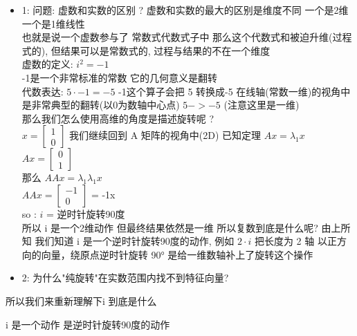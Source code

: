 \documentclass[12pt]{article}
\begin{document}
\begin{flushleft}
\begin{itemize}
        \item 1: 问题: 虚数和实数的区别 ?
              虚数和实数的最大的区别是维度不同 一个是2维 一个是1维线性 \\
              也就是说一个虚数参与了 常数式代数式子中 那么这个代数式和被迫升维(过程式的), 但结果可以是常数式的, 过程与结果的不在一个维度\\
              虚数的定义: $i^{2} = -1$  \\
              -1是一个非常标准的常数 它的几何意义是翻转 \\
              代数表达: $5 \cdot -1 = -5$ -1这个算子会把 5 转换成-5 在线轴(常数一维)的视角中 是非常典型的翻转(以0为数轴中心点) $5 -> -5$ (注意这里是一维)\\
              那么我们怎么使用高维的角度是描述旋转呢 ? \\
              $x = \begin{bmatrix}
                      1 \\
                      0
                  \end{bmatrix}$
              我们继续回到 A 矩阵的视角中(2D) 已知定理 $Ax = \lambda_{1}x$  \\
              $Ax = \begin{bmatrix}
                      0 \\
                      1
                  \end{bmatrix}$  \\
              那么 $AAx = \lambda_{1}\lambda_{1}x$ \\
              $AAx = \begin{bmatrix}
                      -1 \\
                      0
                  \end{bmatrix}$ = -1x  \\
              so :  $i$ = 逆时针旋转90度 \\
              所以 i 是一个2维动作 但最终结果依然是一维
              所以复数到底是什么呢?
              由上所知 我们知道 i 是一个逆时针旋转90度的动作, 例如 $2 \cdot i$ 把长度为 2 轴 以正方向的向量，绕原点逆时针旋转 90°
              是给一维数轴补上了旋转这个操作
        \item 2: 为什么"纯旋转"在实数范围内找不到特征向量?



    \end{itemize}

    所以我们来重新理解下i  到底是什么

    i 是一个动作 是逆时针旋转90度的动作


\end{flushleft}
\end{document}

